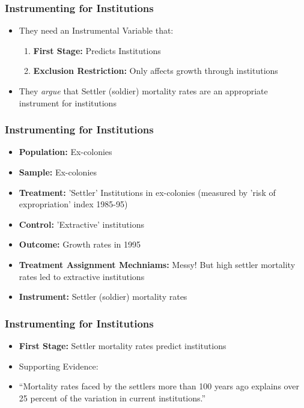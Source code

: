 \documentclass[xcolor=x11names,compress]{beamer}\usepackage[]{graphicx}\usepackage[]{color}
\renewcommand{\(}{\begin{columns}}
\renewcommand{\)}{\end{columns}}
\newcommand{\<}[1]{\begin{column}{#1}}
\renewcommand{\>}{\end{column}}
\begin{document}
\begin{frame}
\frametitle{Instrumenting for Institutions}
\begin{itemize}
\item They need an Instrumental Variable that:
\pause
\begin{enumerate}
\item \textbf{First Stage:} \pause Predicts Institutions
\pause
\item \textbf{Exclusion Restriction:} \pause Only affects growth through institutions
\end{enumerate}
\pause
\item They \textit{argue} that Settler (soldier) mortality rates are an appropriate instrument for institutions
\end{itemize}
\end{frame}


\begin{frame}
\frametitle{Instrumenting for Institutions}
\begin{itemize}
\item \textbf{Population:} \pause Ex-colonies
\pause
\item \textbf{Sample:} \pause Ex-colonies
\pause
\item \textbf{Treatment:} \pause 'Settler' Institutions in ex-colonies (measured by 'risk of expropriation' index 1985-95)
\pause
\item \textbf{Control:} \pause 'Extractive' institutions
\pause
\item \textbf{Outcome:} \pause Growth rates in 1995
\pause
\item \textbf{Treatment Assignment Mechniams:} \pause Messy! But high settler mortality rates led to extractive institutions
\pause
\item \textbf{Instrument:} \pause Settler (soldier) mortality rates
\end{itemize}
\end{frame}

\begin{frame}
\frametitle{Instrumenting for Institutions}
\begin{itemize}
\item \textbf{First Stage:} \pause Settler mortality rates predict institutions
\pause
\item Supporting Evidence:
\pause
\item ``Mortality rates faced by the settlers more than 100 years ago explains over 25 percent of the variation in current institutions.''
\end{itemize}
\end{frame}
\end{document}
